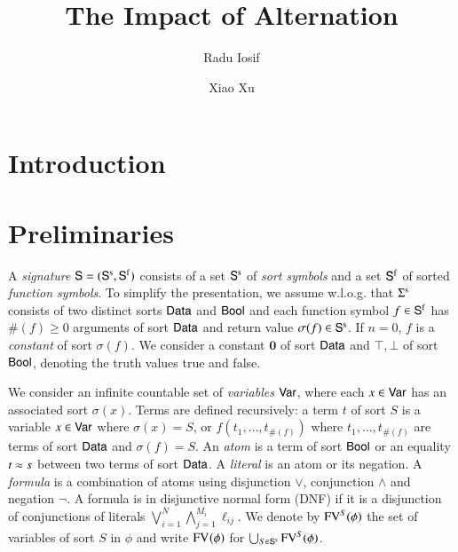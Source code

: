 \documentclass{llncs}
\begin{document}

\title{The Impact of Alternation}

\author{Radu Iosif \and Xiao Xu}


\maketitle

\begin{abstract}
\end{abstract}

\section{Introduction}

\section{Preliminaries}

A \emph{signature} $\mathsf{S} = (\mathsf{S}^\mathrm{s},\mathsf{S}^\mathrm{f})$ consists of a
set $\mathsf{S}^\mathrm{s}$ of \emph{sort symbols} and a set $\mathsf{S}^\mathrm{f}$ of
sorted \emph{function symbols}. To simplify the presentation, we
assume w.l.o.g. that $\Sigma^\mathrm{s}$ consists of two distinct sorts
$\mathsf{Data}$ and $\mathsf{Bool}$ and each function symbol $f \in \mathsf{S}^\mathrm{f}$ has
$\#(f) \geq 0$ arguments of sort $\mathsf{Data}$ and return value $\sigma(f)
\in \mathsf{S}^\mathrm{s}$. If $n=0$, $f$ is a \emph{constant} of sort
$\sigma(f)$. We consider a constant $\mathbf{0}$ of sort $\mathsf{Data}$ and
$\top,\bot$ of sort $\mathsf{Bool}$, denoting the truth values true and false.

We consider an infinite countable set of \emph{variables} $\mathsf{Var}$,
where each $x \in \mathsf{Var}$ has an associated sort $\sigma(x)$. Terms are
defined recursively: a term $t$ of sort $S$ is a variable $x \in
\mathsf{Var}$ where $\sigma(x)=S$, or $f(t_1,\ldots,t_{\#(f)})$ where
$t_1,\ldots,t_{\#(f)}$ are terms of sort $\mathsf{Data}$ and $\sigma(f)=S$. An
\emph{atom} is a term of sort $\mathsf{Bool}$ or an equality $t \approx s$
between two terms of sort $\mathsf{Data}$. A \emph{literal} is an atom or its
negation. A \emph{formula} is a combination of atoms using disjunction
$\vee$, conjunction $\wedge$ and negation $\neg$.  A formula is in
disjunctive normal form (DNF) if it is a disjunction of conjunctions
of literals $\bigvee_{i=1}^N \bigwedge_{j=1}^{M_i} \ell_{ij}$. We
denote by $\mathrm{FV}^{S}(\phi)$ the set of variables of sort $S$ in $\phi$
and write $\mathrm{FV}^{}(\phi)$ for $\bigcup_{S \in \mathsf{S}^\mathrm{s}}
\mathrm{FV}^{S}(\phi)$. 
\end{document}
